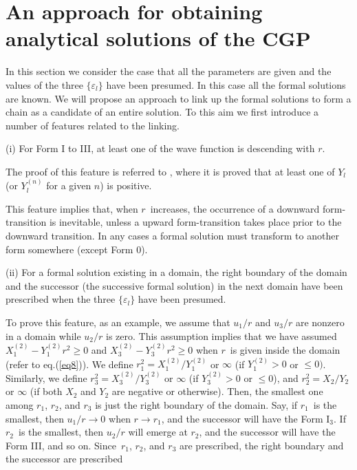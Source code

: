 \documentclass[single-column,showpacs,groupedaddress]{revtex4}
\begin{document}
\section*{An approach for obtaining analytical solutions of the CGP}

In this section we consider the case that all the parameters are given and
the values of the three $\{{\varepsilon _{l}\}}$ have been presumed. In this
case all the formal solutions are known. We will propose an approach to link
up the formal solutions to form a chain as a candidate of an entire
solution. To this aim we first introduce a number of features related to the
linking.

(i) For Form I to III, at least one of the wave function is descending with $%
r$.

The proof of this feature is referred to \cite{liu}, where it is proved that
at least one of $Y_{l}$ (or $Y_{l}^{(n)}$ for a given $n$) is positive.

This feature implies that, when $r$\ increases, the occurrence of a downward
form-transition is inevitable, unless a upward form-transition takes place
prior to the downward transition. In any cases a formal solution must
transform to another form somewhere (except Form 0).

(ii) For a formal solution existing in a domain, the right boundary of the
domain and the successor (the successive formal solution) in the next domain
have been prescribed when the three $\{{\varepsilon _{l}\}}$ have been
presumed.

To prove this feature, as an example, we assume that $u_{1}/r$ and $u_{3}/r$
are nonzero in a domain while $u_{2}/r$ is zero. This assumption implies
that we have assumed $X_{1}^{(2)}-Y_{1}^{(2)}r^{2}\geq 0$ and $%
X_{3}^{(2)}-Y_{3}^{(2)}r^{2}\geq 0$ when $r$\ is given inside the domain
(refer to eq.(\ref{eq8})). We define $r_{1}^{2}=X_{1}^{(2)}/Y_{1}^{(2)}$ or $%
\infty $ (if $Y_{1}^{(2)}>0$ or $\leq 0)$. Similarly, we define $%
r_{3}^{2}=X_{3}^{(2)}/Y_{3}^{(2)}$ or $\infty $ (if $Y_{3}^{(2)}>0$ or $\leq
0$), and $r_{2}^{2}=X_{2}/Y_{2}$ or $\infty $ (if both $X_{2}$ and $Y_{2}$
are negative or otherwise). Then, the smallest one among $r_{1}$, $r_{2}$,
and $r_{3}$ is just the right boundary of the domain. Say, if $r_{1}$\ is
the smallest, then $u_{1}/r\rightarrow 0$ when $r\rightarrow r_{1}$, and the
successor will have the Form I$_{3}$. If $r_{2}$\ is the smallest, then $%
u_{2}/r$ will emerge at $r_{2}$, and the successor will have the Form III,
and so on. Since\ $r_{1}$, $r_{2}$, and $r_{3}$ are prescribed, the right
boundary and the successor are prescribed
\end{document}
